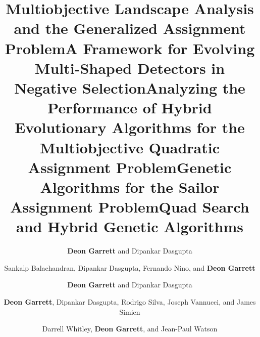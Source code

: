 \documentclass[a4paper,10pt]{cvclean}
\begin{document}
\begin{publications}
\begin{conferencepapers}
\begin{paper}
    \end{paper}
    \begin{paper}
      \title{Multiobjective Landscape Analysis and the Generalized Assignment
        Problem}
      \author{\textbf{Deon Garrett} and Dipankar Dasgupta}
    \end{paper}
    \begin{paper}
      \title{A Framework for Evolving Multi-Shaped Detectors in Negative Selection}
      \author{Sankalp Balachandran, Dipankar Dasgupta, Fernando Nino, and \textbf{Deon
        Garrett}}
    \end{paper}
    \begin{paper}
      \title{Analyzing the Performance of Hybrid Evolutionary Algorithms for the
        Multiobjective Quadratic Assignment Problem}
      \author{\textbf{Deon Garrett} and Dipankar Dasgupta}
    \end{paper}
    \begin{paper}
      \title{Genetic Algorithms for the Sailor Assignment Problem}
      \author{\textbf{Deon Garrett}, Dipankar Dasgupta, Rodrigo Silva, Joseph Vannucci,
        and James Simien}
    \end{paper}
    \begin{paper}
      \title{Quad Search and Hybrid Genetic Algorithms}
      \author{Darrell Whitley, \textbf{Deon Garrett}, and Jean-Paul Watson}
    \end{paper}
  \end{conferencepapers}


\end{publications}
\end{document}
